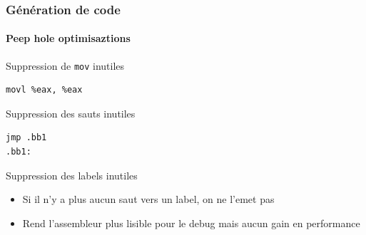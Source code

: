 \documentclass{beamer}
\begin{document}
\begin{frame}[fragile]
    \frametitle{Génération de code}
    \framesubtitle{Peep hole optimisaztions}

    \begin{block}{Suppression de \lstinline{mov} inutiles}
        \begin{lstlisting}
movl %eax, %eax
        \end{lstlisting}
    \end{block}

    \begin{block}{Suppression des sauts inutiles}
        \begin{lstlisting}
jmp .bb1
.bb1:
        \end{lstlisting}
    \end{block}

    \begin{block}{Suppression des labels inutiles}
        \begin{itemize}
            \item Si il n'y a plus aucun saut vers un label, on ne l'emet pas
            \item Rend l'assembleur plus lisible pour le debug mais aucun gain en performance
        \end{itemize}
    \end{block}
\end{frame}
\end{document}
